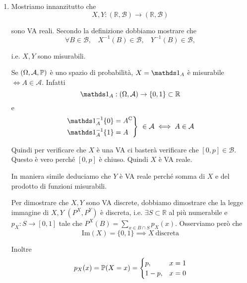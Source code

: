 \ParteSoluzioni






\Soluzione
\begin{enumerate}
\item Mostriamo innanzitutto che
\begin{equation*}
X,Y:(\mathbb{R} ,\mathcal{B})\rightarrow (\mathbb{R} ,\mathcal{B})
\end{equation*}

sono VA reali. Secondo la definizione dobbiamo mostrare che
\begin{equation*}
\forall B\in \mathcal{B} ,\ \ \ \ X^{-1}( B) \in \mathcal{B} ,\ \ \ \ Y^{-1}( B) \in \mathcal{B} ,
\end{equation*}

i.e. $X,Y$ sono misurabili.\begin{oss}
Se $( \Omega ,\mathcal{A} ,\mathbb{P})$ è uno spazio di probabilità, $X=\Ind_{A}$ è misurabile $\iff A\in \mathcal{A}$. Infatti
\begin{equation*}
\Ind_{A} :( \Omega ,\mathcal{A})\rightarrow \{0,1\} \subset \mathbb{R}
\end{equation*}
e
\begin{equation*}
\begin{drcases}
\Ind_{A}^{-1}\{0\} =A\comp\\
\Ind_{A}^{-1}\{1\} =A
\end{drcases}
\ \in \mathcal{A} \iff A\in \mathcal{A}
\end{equation*}
\end{oss}

Quindi per verificare che $X$ è una VA ci basterà verificare che $[ 0,p] \in \mathcal{B}$. Questo è vero perché $[ 0,p]$ è chiuso. Quindi $X$ è VA reale.

In maniera simile deduciamo che $Y$ è VA reale perché somma di $X$ e del prodotto di funzioni misurabili.

Per dimostrare che $X,Y$ sono VA discrete, dobbiamo dimostrare che la legge immagine di $X,Y$ $\left( P^{X} ,P^{Y}\right)$ è discreta, i.e. $\exists S\subset \mathbb{R}$ al più numerabile e $p_{X} :S\rightarrow [ 0,1]$ tale che $P^{X}( B) =\sum\limits _{x\in B\cap S} p_{X}( x)$. Osserviamo però che
\begin{equation*}
\mathrm{Im}( X) =\{0,1\} \implies X\ \text{discreta}
\end{equation*}

Inoltre
\begin{equation*}
p_{X}( x) =\mathbb{P}( X=x) =\begin{cases}
p, & x=1\\
1-p, & x=0
\end{cases}
\end{equation*}


\end{enumerate}
